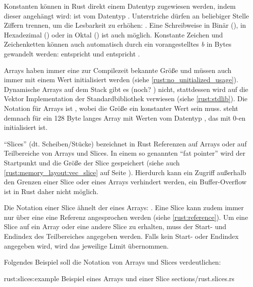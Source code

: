 Konstanten können in Rust direkt einem Datentyp zugewiesen werden, indem dieser angehängt wird:  ist vom Datentyp .
Unterstriche dürfen an beliebiger Stelle Ziffern trennen, um die Lesbarkeit zu erhöhen: .
Eine Schreibweise in Binär (), in Hexadezimal () oder in Oktal () ist auch möglich. 
Konstante Zeichen und Zeichenketten können auch automatisch durch ein vorangestelltes \textit{b} in Bytes gewandelt werden:  entspricht  und  entspricht \rustcinline{&[0x61_u8, 0x62_u8, 0x63_u8]}.

Arrays haben immer eine zur Compilezeit bekannte Größe und müssen auch immer mit einem Wert initialisiert werden (siehe \autoref{rust:no_unitialized_usage}).
Dynamische Arrays auf dem Stack gibt es (noch? \cite{rust:github:alloca}) nicht,
stattdessen wird auf die Vektor Implementation der Standardbibliothek verwiesen (siehe \autoref{rust:stdlib}).
Die Notation für Arrays ist , wobei die Größe ein konstanter Wert sein muss.
\rustcinline{[0_u8; 128]} steht demnach für ein 128 Byte langes Array mit Werten vom Datentyp , das mit 0-en initialisiert ist.

\enquote{Slices} (dt. Scheiben/Stücke) bezeichnet in Rust Referenzen auf Arrays oder auf Teilbereiche von Arrays und Slices.
In einem so genannten \enquote{fat pointer} wird der Startpunkt und die Größe der Slice gespeichert  (siehe auch \autoref{rust:memory_layout:vec_slice} auf Seite \pageref{rust:memory_layout:vec_slice}).
Hierdurch kann ein Zugriff außerhalb den Grenzen einer Slice oder eines Arrays verhindert werden, %
ein Buffer-Overflow ist in Rust daher nicht möglich.

Die Notation einer Slice ähnelt der eines Arrays: \rustcinline{&[<Datentyp>]}.
Eine Slice kann zudem immer nur über eine eine Referenz angesprochen werden (siehe \autoref{rust:reference}).
Um eine Slice auf ein Array oder eine andere Slice zu erhalten, muss der Start- und  Endindex des Teilbereiches angegeben werden.
Falls kein Start- oder Endindex angegeben wird, wird das jeweilige Limit übernommen.


Folgendes Beispiel soll die Notation von Arrays und Slices verdeutlichen:

\rustcinclude
	{rust:slices:example}
	{Beispiel eines Arrays und einer Slice}
	{sections/rust.slices.rs}
	
